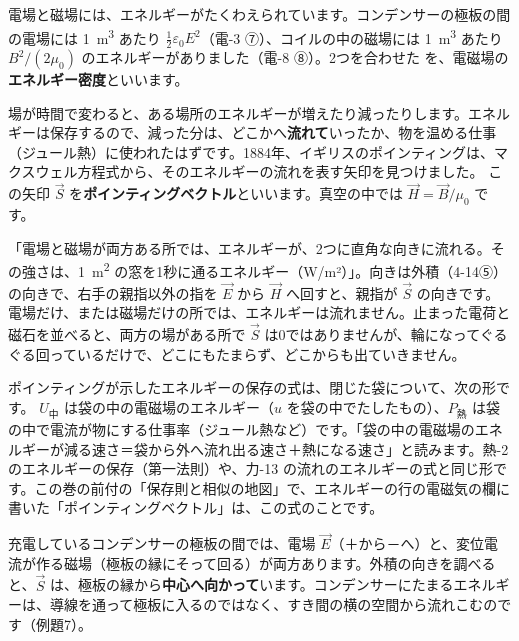 \leavevmode\label{ph:電-14:sec7}電場と磁場には、エネルギーがたくわえられています。コンデンサーの極板の間の電場には \qty{1}{m^3} あたり $\tfrac12\varepsilon_0E^2$（電-3 ⑦）、コイルの中の磁場には \qty{1}{m^3} あたり $B^2/(2\mu_0)$ のエネルギーがありました（電-8 ⑧）。2つを合わせた
\label{ph:電-14:u}を、電磁場の\textbf{エネルギー密度}といいます。

場が時間で変わると、ある場所のエネルギーが増えたり減ったりします。エネルギーは保存するので、減った分は、どこかへ\textbf{流れて}いったか、物を温める仕事（ジュール熱）に使われたはずです。1884年、イギリスのポインティングは、マクスウェル方程式から、そのエネルギーの流れを表す矢印を見つけました。
\label{ph:電-14:poynting}この矢印 $\vec S$ を\textbf{ポインティングベクトル}といいます。真空の中では $\vec H=\vec B/\mu_0$ です。

\begin{phyomi}[$\vec S=\vec E\times\vec H$]
「電場と磁場が両方ある所では、エネルギーが、2つに直角な向きに流れる。その強さは、\qty{1}{m^2} の窓を1秒に通るエネルギー（W/m²）」。向きは外積（4-14⑤）の向きで、右手の親指以外の指を $\vec E$ から $\vec H$ へ回すと、親指が $\vec S$ の向きです。電場だけ、または磁場だけの所では、エネルギーは流れません。止まった電荷と磁石を並べると、両方の場がある所で $\vec S$ は0ではありませんが、輪になってぐるぐる回っているだけで、どこにもたまらず、どこからも出ていきません。
\end{phyomi}

ポインティングが示したエネルギーの保存の式は、閉じた袋について、次の形です。
\label{ph:電-14:hozon}$U_{\text{中}}$ は袋の中の電磁場のエネルギー（$u$ を袋の中でたしたもの）、$P_{\text{熱}}$ は袋の中で電流が物にする仕事率（ジュール熱など）です。「袋の中の電磁場のエネルギーが減る速さ＝袋から外へ流れ出る速さ＋熱になる速さ」と読みます。熱-2 のエネルギーの保存（第一法則）や、力-13 の流れのエネルギーの式と同じ形です。この巻の前付の「保存則と相似の地図」で、エネルギーの行の電磁気の欄に書いた「ポインティングベクトル」は、この式のことです。

\begin{phmijika}
充電しているコンデンサーの極板の間では、電場 $\vec E$（＋から－へ）と、変位電流が作る磁場（極板の縁にそって回る）が両方あります。外積の向きを調べると、$\vec S$ は、極板の縁から\textbf{中心へ向かって}います。コンデンサーにたまるエネルギーは、導線を通って極板に入るのではなく、すき間の横の空間から流れこむのです（例題7）。
\end{phmijika}

